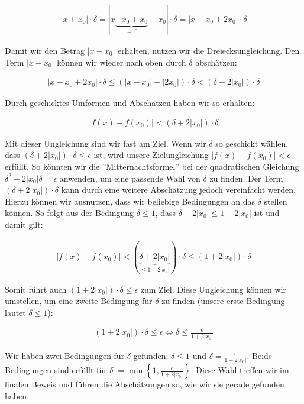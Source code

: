 \documentclass[fontsize=9pt,
               parskip=half-,
               DIV=14,
               listof=chapterentry,
               tocflat]{scrbook}
\begin{document}
\begin{solutionprocess*}
\begin{align*}
|x+x_{0}|\cdot \delta =|x\underbrace {-x_{0}+x_{0}} _{=\ 0}+x_{0}|\cdot \delta =|x-x_{0}+2x_{0}|\cdot \delta 
\end{align*}

Damit wir den Betrag $|x-x_{0}|$ erhalten, nutzen wir die Dreiecksungleichung. Den Term $|x-x_{0}|$ können wir wieder nach oben durch $\delta $ abschätzen:

\begin{align*}
|x-x_{0}+2x_{0}|\cdot \delta \leq (|x-x_{0}|+|2x_{0}|)\cdot \delta <(\delta +2|x_{0}|)\cdot \delta 
\end{align*}

Durch geschicktes Umformen und Abschätzen haben wir so erhalten:

\begin{align*}
|f(x)-f(x_{0})|<(\delta +2|x_{0}|)\cdot \delta 
\end{align*}

Mit dieser Ungleichung sind wir fast am Ziel. Wenn wir $\delta $ so geschickt wählen, dass $(\delta +2|x_{0}|)\cdot \delta \leq \epsilon $ ist, wird unsere Zielungleichung $|f(x)-f(x_{0})|<\epsilon $ erfüllt. So könnten wir die {''}Mitternachtsformel{''} bei der quadratischen Gleichung $\delta ^{2}+2|x_{0}|\delta =\epsilon $ anwenden, um eine passende Wahl von $\delta $ zu finden. Der Term $(\delta +2|x_{0}|)\cdot \delta $ kann durch eine weitere Abschätzung jedoch vereinfacht werden. Hierzu können wir ausnutzen, dass wir beliebige Bedingungen an das $\delta $ stellen können. So folgt aus der Bedingung $\delta \leq 1$, dass $\delta +2|x_{0}|\leq 1+2|x_{0}|$ ist und damit gilt:

\begin{align*}
|f(x)-f(x_{0})|<(\underbrace {\delta +2|x_{0}|} _{\leq 1+2|x_{0}|})\cdot \delta \leq (1+2|x_{0}|)\cdot \delta 
\end{align*}

Somit führt auch $(1+2|x_{0}|)\cdot \delta \leq \epsilon $ zum Ziel. Diese Ungleichung können wir umstellen, um eine zweite Bedingung für $\delta $ zu finden (unsere erste Bedingung lautet $\delta \leq 1$):

\begin{align*}
(1+2|x_{0}|)\cdot \delta \leq \epsilon \iff \delta \leq {\frac {\epsilon }{1+2|x_{0}|}}
\end{align*}

Wir haben zwei Bedingungen für $\delta $ gefunden: $\delta \leq 1$ und $\delta ={\tfrac {\epsilon }{1+2|x_{0}|}}$. Beide Bedingungen sind erfüllt für $\delta :=\min \left\{1,{\tfrac {\epsilon }{1+2|x_{0}|}}\right\}$. Diese Wahl treffen wir im finalen Beweis und führen die Abschätzungen so, wie wir sie gerade gefunden haben.

\end{solutionprocess*}
\end{document}
